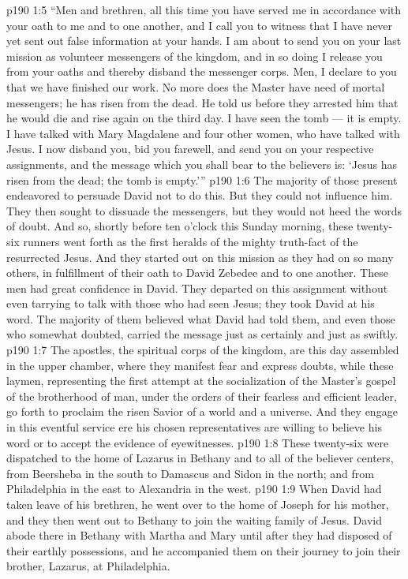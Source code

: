 \vs p190 1:5 \pc “Men and brethren, all this time you have served me in accordance with your oath to me and to one another, and I call you to witness that I have never yet sent out false information at your hands. I am about to send you on your last mission as volunteer messengers of the kingdom, and in so doing I release you from your oaths and thereby disband the messenger corps. Men, I declare to you that we have finished our work. No more does the Master have need of mortal messengers; he has risen from the dead. He told us before they arrested him that he would die and rise again on the third day. I have seen the tomb --- it is empty. I have talked with Mary Magdalene and four other women, who have talked with Jesus. I now disband you, bid you farewell, and send you on your respective assignments, and the message which you shall bear to the believers is: ‘Jesus has risen from the dead; the tomb is empty.’”
\vs p190 1:6 \pc The majority of those present endeavored to persuade David not to do this. But they could not influence him. They then sought to dissuade the messengers, but they would not heed the words of doubt. And so, shortly before ten o’clock this Sunday morning, these twenty\hyp{}six runners went forth as the first heralds of the mighty truth\hyp{}fact of the resurrected Jesus. And they started out on this mission as they had on so many others, in fulfillment of their oath to David Zebedee and to one another. These men had great confidence in David. They departed on this assignment without even tarrying to talk with those who had seen Jesus; they took David at his word. The majority of them believed what David had told them, and even those who somewhat doubted, carried the message just as certainly and just as swiftly.
\vs p190 1:7 \pc The apostles, the spiritual corps of the kingdom, are this day assembled in the upper chamber, where they manifest fear and express doubts, while these laymen, representing the first attempt at the socialization of the Master’s gospel of the brotherhood of man, under the orders of their fearless and efficient leader, go forth to proclaim the risen Savior of a world and a universe. And they engage in this eventful service ere his chosen representatives are willing to believe his word or to accept the evidence of eyewitnesses.
\vs p190 1:8 \pc These twenty\hyp{}six were dispatched to the home of Lazarus in Bethany and to all of the believer centers, from Beersheba in the south to Damascus and Sidon in the north; and from Philadelphia in the east to Alexandria in the west.
\vs p190 1:9 When David had taken leave of his brethren, he went over to the home of Joseph for his mother, and they then went out to Bethany to join the waiting family of Jesus. David abode there in Bethany with Martha and Mary until after they had disposed of their earthly possessions, and he accompanied them on their journey to join their brother, Lazarus, at Philadelphia.
